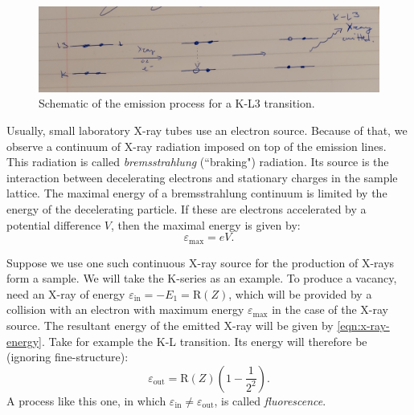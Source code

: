\documentclass[11pt,a4paper,twoside,onecolumn]{article}
\newcommand{\rydberg}{\mathrm{R}}
\begin{document}
\begin{figure}[!htbp]
    \centering
    \includegraphics[width=\textwidth]{img/emission-diagram.png}
    \caption{Schematic of the emission process for a K-L3 transition.}\label{fig:emission-diagram}
\end{figure}

Usually, small laboratory X-ray tubes use an electron source. Because of that, we observe a continuum of X-ray radiation imposed on top of the emission lines. This radiation is called \emph{bremsstrahlung} (``braking") radiation. Its source is the interaction between decelerating electrons and stationary charges in the sample lattice. The maximal energy of a bremsstrahlung continuum is limited by the energy of the decelerating particle. If these are electrons accelerated by a potential difference $V$, then the maximal energy is given by: 
\begin{equation}\label{eqn:bremss-energy-max}
    \varepsilon_\mathrm{max} = eV.
\end{equation}

Suppose we use one such continuous X-ray source for the production of X-rays form a sample. We will take the K-series as an example. To produce a vacancy, need an X-ray of energy $\varepsilon_\mathrm{in} = - E_1 = \rydberg(Z)$, which will be provided by a collision with an electron with maximum energy $\varepsilon_\mathrm{max}$ in the case of the X-ray source. The resultant energy of the emitted X-ray will be given by \eqref{eqn:x-ray-energy}. Take for example the K-L transition. Its energy will therefore be (ignoring fine-structure):
\begin{equation}\label{eqn:Kalpha-energy-out}
    \varepsilon_\mathrm{out} = \rydberg\left(Z\right) \left(1 - \frac{1}{2^2}\right).
\end{equation}
A process like this one, in which $\varepsilon_\mathrm{in} \neq \varepsilon_\mathrm{out}$, is called \emph{fluorescence}.
\end{document}
